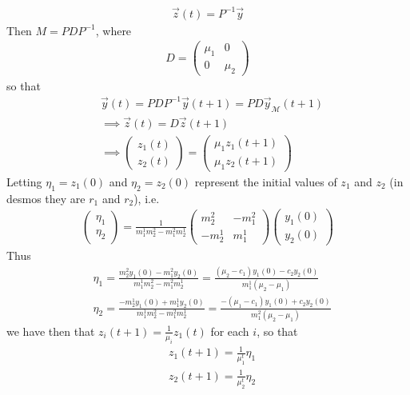 \documentclass{article}
\theoremstyle{theorem}
\begin{document}
\begin{align}
	\vec{z}(t) = P^{-1}\vec{y}
\end{align}
Then $M = PDP^{-1}$, where 
\begin{align}
D = \begin{pmatrix} \mu_1 & 0 \\ 0 & \mu_2 \end{pmatrix}
\end{align} 
so that
\begin{align}
	& \vec{y}(t) = PDP^{-1}\vec{y}(t+1) = PD\vec{y}_{\mathcal{M}}(t+1) \\
	&\implies \vec{z}(t) = D\vec{z}(t+1) \\
	&\implies \begin{pmatrix} z_1(t) \\ z_2(t) \end{pmatrix} = \begin{pmatrix} \mu_1z_1(t+1) \\ \mu_1z_2(t+1) \end{pmatrix}
\end{align}
Letting $\eta_1 = z_1(0)$ and $\eta_2 = z_2(0)$ represent the initial values of $z_1$ and $z_2$ (in desmos they are $r_1$ and $r_2$), i.e.
\begin{align}
	 \begin{pmatrix} \eta_1 \\ \eta_2 \end{pmatrix} = \frac{1}{m^1_1m^2_2-m^2_1m^1_2} \begin{pmatrix} m^2_2 & -m^2_1 \\ -m^1_2 & m^1_1 \end{pmatrix} \begin{pmatrix} y_1(0) \\ y_2(0) \end{pmatrix}
\end{align}
Thus
\begin{align}
	& \eta_1 = \frac{m^2_2y_1(0)-m^2_1y_2(0)}{m^1_1m^2_2-m^2_1m^1_2} = \frac{(\mu_2-c_1)y_1(0)-c_2y_2(0)}{m^1_1(\mu_2-\mu_1)} \\
	& \eta_2 = \frac{-m^1_2y_1(0)+m^1_1y_2(0)}{m^1_1m^2_2-m^2_1m^1_2} = \frac{-(\mu_1-c_1)y_1(0)+c_2y_2(0)}{m^2_1(\mu_2-\mu_1)}
\end{align} 
 we have then that $z_i(t+1) = \frac{1}{\mu_i}z_1(t)$ for each $i$, so that 
\begin{align}
	 & z_1(t+1) = \frac{1}{\mu_1^t}\eta_1 \\
	 & z_2(t+1) = \frac{1}{\mu_2^t}\eta_2
\end{align}
\end{document}
